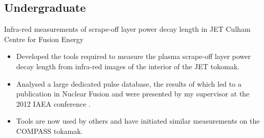 \documentclass[11pt,a4paper,sans]{moderncv}        %
\begin{document}
\subsection{Undergraduate}
{Infra-red measurements of scrape-off layer power decay length in JET}
{\newline Culham Centre for Fusion Energy}{}{}
{\begin{itemize}%
\item Developed the tools required to measure the plasma scrape-off layer power decay length from infra-red images of the interior of the JET tokomak.
\item Analysed a large dedicated pulse database, the results of which led to a publication in Nuclear Fusion \cite{Arnoux2013b} and were presented by my supervisor at the 2012 IAEA conference \cite{IAEA_synopsis}.
\item Tools are now used by others and have initiated similar measurements on the COMPASS tokamak.
\end{itemize}}

\nocite{*}
\end{document}
